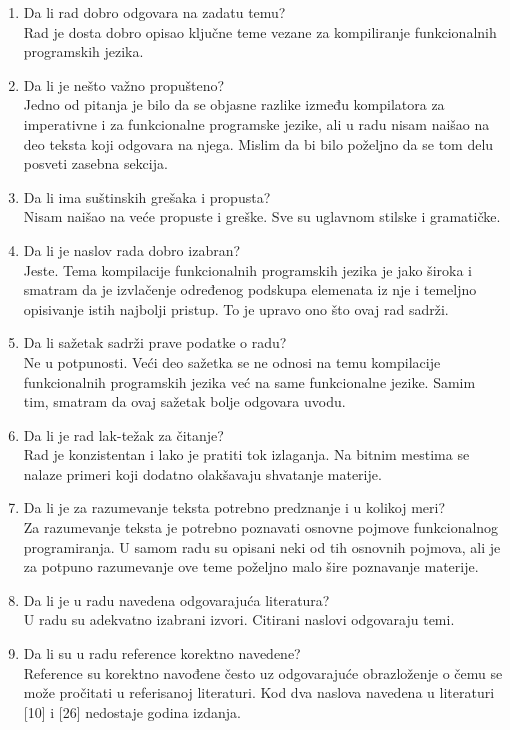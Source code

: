 \documentclass[a4paper]{report}
\begin{document}
\begin{enumerate}
\item Da li rad dobro odgovara na zadatu temu?\\
Rad je dosta dobro opisao ključne teme vezane za kompiliranje funkcionalnih programskih jezika. 
\item Da li je nešto važno propušteno?\\
Jedno od pitanja je bilo da se objasne razlike između kompilatora za imperativne i za funkcionalne programske jezike, ali u radu nisam naišao na  deo teksta koji odgovara na njega. Mislim da bi bilo poželjno da se tom delu posveti zasebna sekcija.
\item Da li ima suštinskih grešaka i propusta?\\
Nisam naišao na veće propuste i greške. Sve su uglavnom stilske i gramatičke.
\item Da li je naslov rada dobro izabran?\\
Jeste. Tema kompilacije funkcionalnih programskih jezika je jako široka i smatram da je izvlačenje određenog podskupa elemenata iz nje i temeljno opisivanje istih najbolji pristup. To je upravo ono što ovaj rad sadrži.
\item Da li sažetak sadrži prave podatke o radu?\\
Ne u potpunosti. Veći deo sažetka se ne odnosi na temu kompilacije funkcionalnih programskih jezika već na same funkcionalne jezike. Samim tim, smatram da ovaj sažetak bolje odgovara uvodu.
\item Da li je rad lak-težak za čitanje?\\
Rad je konzistentan i lako je pratiti tok izlaganja. Na bitnim mestima se nalaze primeri koji dodatno olakšavaju shvatanje materije.
\item Da li je za razumevanje teksta potrebno predznanje i u kolikoj meri?\\
Za razumevanje teksta je potrebno poznavati osnovne pojmove funkcionalnog programiranja. U samom radu su opisani neki od tih osnovnih pojmova, ali je za potpuno razumevanje ove teme poželjno malo šire poznavanje materije.  
\item Da li je u radu navedena odgovarajuća literatura?\\
U radu su adekvatno izabrani izvori. Citirani naslovi odgovaraju temi.
\item Da li su u radu reference korektno navedene?\\
Reference su korektno navođene često uz odgovarajuće obrazloženje o čemu se može pročitati u referisanoj literaturi. Kod dva naslova navedena u literaturi [10] i [26] nedostaje godina izdanja.

\end{enumerate}
\end{document}

